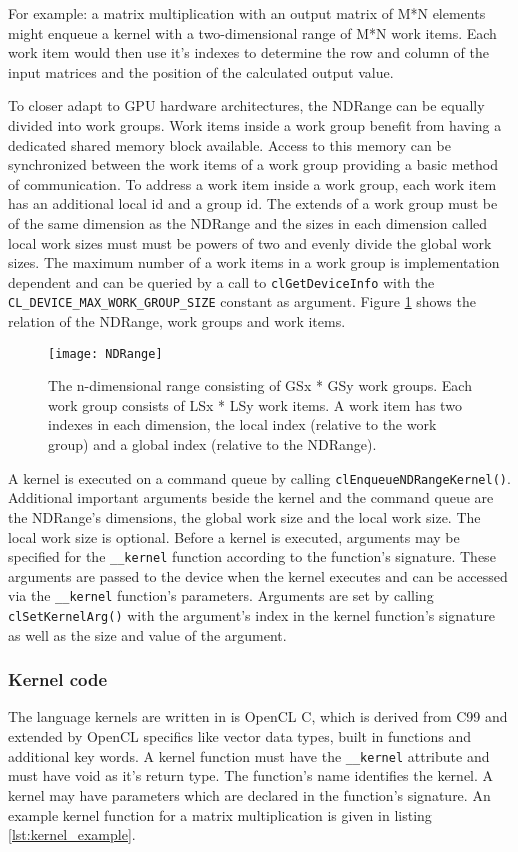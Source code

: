 For example: a matrix multiplication with an output matrix of M*N elements might enqueue a kernel with a two-dimensional range of M*N work items. Each work item would then use it's indexes to determine the row and column of the input matrices and the position of the calculated output value.

To closer adapt to GPU hardware architectures, the NDRange can be equally divided into work groups. Work items inside a work group benefit from having a dedicated shared memory block available. Access to this memory can be synchronized between the work items of a work group providing a basic method of communication. To address a work item inside a work group, each work item has an additional local id and a group id. The extends of a work group must be of the same dimension as the NDRange and the sizes in each dimension called local work sizes must must be powers of two and evenly divide the global work sizes. \cite[p.18]{opencl_book} The maximum number of a work items in a work group is implementation dependent and can be queried by a call to \lstinline!clGetDeviceInfo! with the \lstinline!CL_DEVICE_MAX_WORK_GROUP_SIZE! constant as argument. Figure \ref{fig:NDRange} shows the relation of the NDRange, work groups and work items. 

\begin{figure} 
\centering
\texttt{[image: NDRange]}
\caption{The n-dimensional range consisting of GSx * GSy work groups. Each work group consists of LSx * LSy work items. A work item has two indexes in each dimension, the local index (relative to the work group) and a global index (relative to the NDRange).}
\label{fig:NDRange}
\end{figure}

A kernel is executed on a command queue by calling \lstinline!clEnqueueNDRangeKernel()!. Additional important arguments beside the kernel and the command queue are the NDRange's dimensions, the global work size and the local work size. The local work size is optional. Before a kernel is executed, arguments may be specified for the \lstinline!__kernel! function according to the function's signature. These arguments are passed to the device when the kernel executes and can be accessed via the \lstinline!__kernel! function's parameters. Arguments are set by calling \lstinline!clSetKernelArg()! with the argument's index in the kernel function's signature as well as the size and value of the argument.

\subsubsection{Kernel code}
The language kernels are written in is OpenCL C, which is derived from C99 and extended by OpenCL specifics like vector data types, built in functions and additional key words. A kernel function must have the \lstinline!__kernel! attribute and must have void as it's return type. The function's name identifies the kernel. A kernel may have parameters which are declared in the function's signature. An example kernel function for a matrix multiplication is given in listing \ref{lst:kernel_example}.

